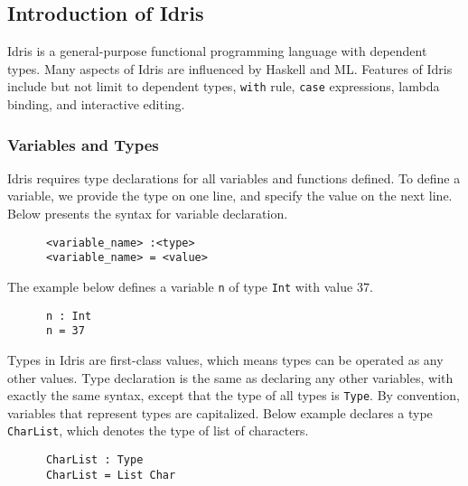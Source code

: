 \subsection{Introduction of Idris}
Idris is a general-purpose functional programming language with dependent types. Many aspects of Idris are influenced by Haskell and ML. Features of Idris include but not limit to dependent types, \texttt{with} rule, \texttt{case} expressions, lambda binding, and interactive editing. 

\subsubsection*{Variables and Types}
Idris requires type declarations for all variables and functions defined. To define a variable, we provide the type on one line, and specify the value on the next line. Below presents the syntax for variable declaration. 
\begin{lstlisting}
      <variable_name> :<type> 
      <variable_name> = <value>
\end{lstlisting}
The example below defines a variable \texttt{n} of type \texttt{Int} with value $37$. 
\begin{lstlisting}
      n : Int
      n = 37
\end{lstlisting}
Types in Idris are first-class values, which means types can be operated as any other values. Type declaration is the same as declaring any other variables, with exactly the same syntax, except that the type of all types is \texttt{Type}. By convention, variables that represent types are capitalized. Below example declares a type \texttt{CharList}, which denotes the type of list of characters. 
\begin{lstlisting}
      CharList : Type
      CharList = List Char
\end{lstlisting}


